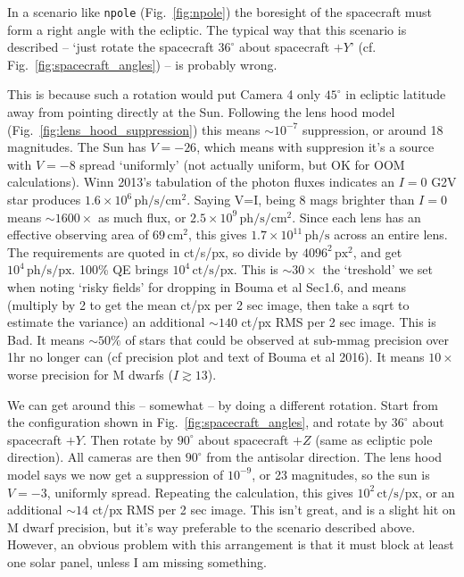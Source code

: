 \documentclass{article}
\begin{document}
	In a scenario like \texttt{npole} (Fig.~\ref{fig:npole}) the boresight of 
	the spacecraft must form a right angle with the ecliptic.
	The typical way that this scenario is described -- `just rotate the 
	spacecraft $36^\circ$ about spacecraft $+Y$' (cf. 
	Fig.~\ref{fig:spacecraft_angles}) -- is probably wrong.
	
	This is because such a rotation would put Camera 4 only $45^\circ$ in 
	ecliptic latitude away from pointing directly at the Sun.
	Following the lens hood model (Fig.~\ref{fig:lens_hood_suppression}) this 
	means $\sim 10^{-7}$ suppression, or around 18 magnitudes.
  The Sun has $V=-26$, which means with suppresion it's a source with 
  $V=-8$ spread `uniformly' (not actually uniform, but OK for OOM 
  calculations).
  Winn 2013's tabulation of the photon fluxes indicates an $I=0$ G2V star 
  produces $1.6\times 10^6\,\mathrm{ph/s/cm^2}$. 
  Saying V=I, being 8 mags brighter than $I=0$ means $\sim\!1600\times$ as 
  much 
  flux, or 
  $2.5 \times 10^9\,\mathrm{ph/s/cm^2}$.
	Since each lens has an effective observing area of $69\,\mathrm{cm^2}$, this 
	gives $1.7\times 10^{11}\,\mathrm{ph/s}$ across an entire lens.
	The requirements are quoted in ct/s/px, so divide by 
	$4096^2\,\mathrm{px^2}$, and get $10^4\,\mathrm{ph/s/px}$. 100\% QE brings 
	$10^4\,\mathrm{ct/s/px}$.
	This is $\sim\!30\times$ the `treshold' we set when noting `risky fields' 
	for dropping 
	in Bouma et al Sec1.6, and means (multiply by 2 to get the mean ct/px per 2 
	sec image, then take a sqrt to estimate the variance) an additional $\sim\! 
	140 $
	ct/px RMS per 2 sec image.
	This is Bad. It means $\sim 50\%$ of stars that could be observed at 
	sub-mmag precision over 1hr no longer can (cf precision plot and text of 
	Bouma et al 2016). It means $10\times$ worse precision for M dwarfs 
	($I\gtrsim 13$).
	
	We can get around this -- somewhat -- by doing a different rotation.
	Start from the configuration shown in Fig.~\ref{fig:spacecraft_angles}, and 
	rotate by $36^\circ$ about 
	spacecraft $+Y$. Then rotate by $90^\circ$ about spacecraft $+Z$ (same as 
	ecliptic pole direction). All cameras are then $90^\circ$ from the 
	antisolar direction.
	The lens hood model says we now get a suppression of $10^{-9}$, or 23 
	magnitudes, so the sun is $V=-3$, uniformly spread.
	Repeating the calculation, this gives $10^2\,\mathrm{ct/s/px}$, 
	or an additional $\sim\!14 $ ct/px RMS per 2 sec image.
	This isn't great, and is a slight hit on M dwarf precision, but it's way 
	preferable to the scenario described above.
	However, an obvious problem with this arrangement is that it must block 
	at least one solar panel, unless I am missing something.
	
\end{document}
